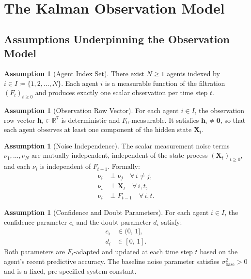 \documentclass[12pt,openany]{book}
\numberwithin{equation}{chapter}
\theoremstyle{plain}
\theoremstyle{definition}
\newtheorem{assumption}[theorem]{Assumption}
\theoremstyle{remark}
\def\mathcal#1{#1}%
\begin{document}
\section{The Kalman Observation Model}

\subsection*{Assumptions Underpinning the Observation Model}
\label{sec:observation-model}

\begin{assumption}[Agent Index Set]
\label{asm:agent-index}
There exist $N \geq 1$ agents indexed by
$i \in \mathcal{I} \coloneqq \{1, 2, \ldots, N\}$.
Each agent $i$ is a measurable function of the filtration
$(\mathcal{F}_t)_{t \geq 0}$ and produces exactly one scalar
observation per time step $t$.
\end{assumption}

\begin{assumption}[Observation Row Vector]
\label{asm:obs-vector}
For each agent $i \in \mathcal{I}$, the observation row vector
$\mathbf{h}_i \in \mathbb{R}^7$ is deterministic and
$\mathcal{F}_0$-measurable.  It satisfies $\mathbf{h}_i \neq
\mathbf{0}$, so that each agent observes at least one component
of the hidden state $\mathbf{X}_t$.
\end{assumption}

\begin{assumption}[Noise Independence]
\label{asm:noise-indep}
The scalar measurement noise terms $\nu_1, \ldots, \nu_N$ are
mutually independent, independent of the state process
$(\mathbf{X}_t)_{t \geq 0}$, and each $\nu_i$ is independent of
$\mathcal{F}_{t-1}$.  Formally:
\begin{align}
  \nu_i &\perp \nu_j \quad \forall\, i \neq j, \label{eq:asm-noise-indep-1}\\
  \nu_i &\perp \mathbf{X}_t \quad \forall\, i, t, \label{eq:asm-noise-indep-2}\\
  \nu_i &\perp \mathcal{F}_{t-1} \quad \forall\, i, t. \label{eq:asm-noise-indep-3}
\end{align}
\end{assumption}

\begin{assumption}[Confidence and Doubt Parameters]
\label{asm:conf-doubt}
For each agent $i \in \mathcal{I}$, the confidence parameter
$c_i$ and the doubt parameter $d_i$ satisfy:
\begin{align}
  c_i &\in (0,\,1], \label{eq:conf-range}\\
  d_i &\in [0,\,1]. \label{eq:doubt-range}
\end{align}
Both parameters are $\mathcal{F}_t$-adapted and updated at each
time step $t$ based on the agent's recent predictive accuracy.
The baseline noise parameter satisfies $\sigma_{\mathrm{base}}^2
> 0$ and is a fixed, pre-specified system constant.
\end{assumption}
\end{document}
